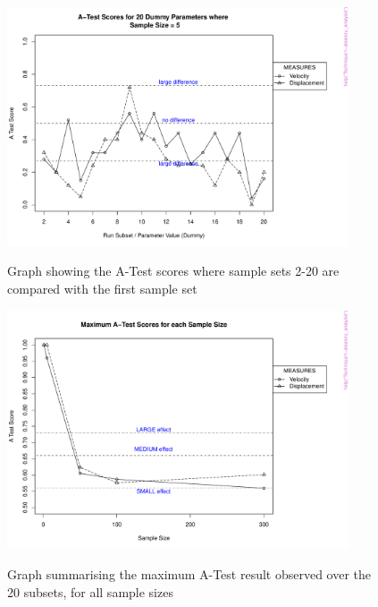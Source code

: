 \documentclass[a4paper,11pt]{article}
\begin{document}
\newpage 
\begin{figure}[h!]
\centering
    \includegraphics[width=0.9\textwidth]{AA_5Samples.pdf}\\ \noindent
    \caption{Graph showing the A-Test scores where sample sets 2-20 are compared with the first sample set}
    \label{AA_5Samples}
    \end{figure}

\begin{figure}[h!]
\centering
    \includegraphics[width=0.9\textwidth]{AA_Results.pdf}\\ \noindent
    \caption{Graph summarising the maximum A-Test result observed over the 20 subsets, for all sample sizes}
    \label{AA_Results}
\end{figure}
\end{document}
